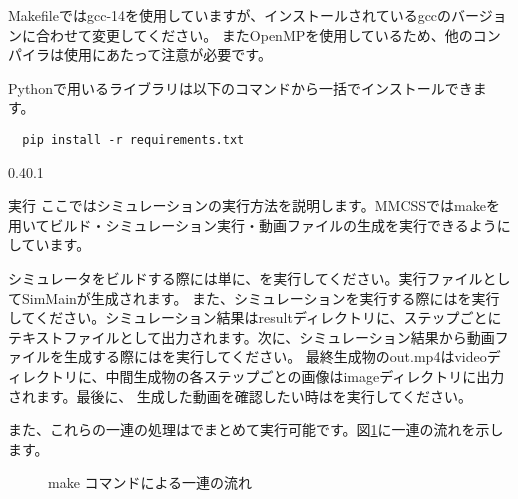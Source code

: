 \documentclass[vipdfmx,a4paper,11pt]{jsarticle}
\makeatletter
\renewcommand{\section}{%
  \@startsection{section}{1}{\z@}%
  {0.4\Cvs}{0.1\Cvs}%
  {\normalfont\large\headfont\raggedright}}
\makeatother
\begin{document}
Makefileではgcc-14を使用していますが、インストールされているgccのバージョンに合わせて変更してください。
またOpenMPを使用しているため、他のコンパイラは使用にあたって注意が必要です。

Pythonで用いるライブラリは以下のコマンドから一括でインストールできます。

\begin{lstlisting}
  pip install -r requirements.txt
\end{lstlisting}

\section{実行}
ここではシミュレーションの実行方法を説明します。MMCSSではmakeを用いてビルド・シミュレーション実行・動画ファイルの生成を実行できるようにしています。

シミュレータをビルドする際には単に、を実行してください。実行ファイルとしてSimMainが生成されます。
また、シミュレーションを実行する際にはを実行してください。シミュレーション結果はresultディレクトリに、ステップごとに
テキストファイルとして出力されます。次に、シミュレーション結果から動画ファイルを生成する際にはを実行してください。
最終生成物のout.mp4はvideoディレクトリに、中間生成物の各ステップごとの画像はimageディレクトリに出力されます。最後に、
生成した動画を確認したい時はを実行してください。


また、これらの一連の処理はでまとめて実行可能です。図\ref{fig:appMake}に一連の流れを示します。

\begin{figure}[tbp]
  \centering
  \caption{make コマンドによる一連の流れ}
  \label{fig:appMake}
\end{figure}
\end{document}
